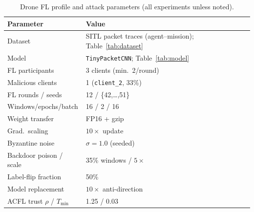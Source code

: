 \begin{table}[t]
\centering
\caption{Drone FL profile and attack parameters (all experiments unless noted).}
\label{tab:setup}
\small
\begin{tabular}{@{}p{}p{}@{}}
\toprule
Parameter & Value \\
\midrule
Dataset & SITL packet traces (agent--mission); Table~\ref{tab:dataset} \\
Model & \texttt{TinyPacketCNN}; Table~\ref{tab:model} \\
FL participants & 3 clients (min.\ 2/round) \\
Malicious clients & 1 (\texttt{client\_2}, 33\%) \\
FL rounds / seeds & 12 / \{42,\ldots,51\} \\
Windows/epochs/batch & 16 / 2 / 16 \\
Weight transfer & FP16 + gzip \\
Grad.\ scaling & $10\times$ update \\
Byzantine noise & $\sigma{=}1.0$ (seeded) \\
Backdoor poison / scale & 35\% windows / $5\times$ \\
Label-flip fraction & 50\% \\
Model replacement & $10\times$ anti-direction \\
ACFL trust $\rho$ / $T_{\min}$ & 1.25 / 0.03 \\
\bottomrule
\end{tabular}
\end{table}
